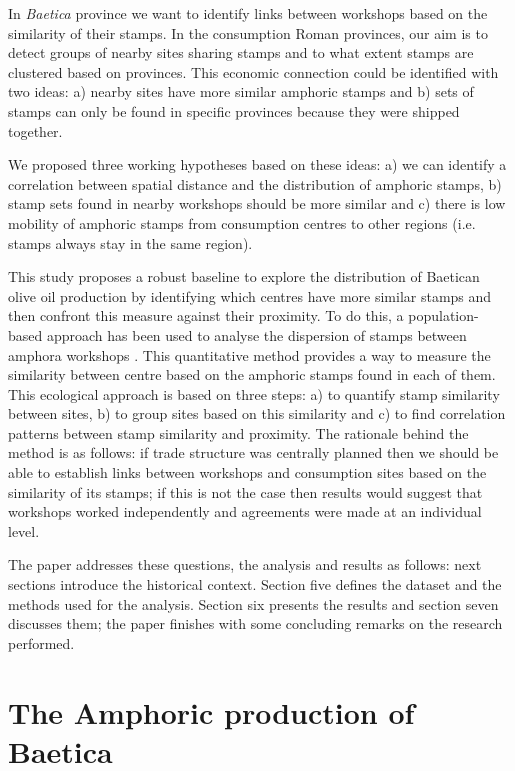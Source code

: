 In \textit{Baetica} province we want to identify links between workshops based on the similarity of their stamps. In the consumption Roman provinces, our aim is to detect groups of nearby sites sharing stamps and to what extent stamps are clustered based on provinces. This economic connection could be identified with two ideas: a) nearby sites have more similar amphoric stamps and b) sets of stamps can only be found in specific provinces because they were shipped together.

We proposed three working hypotheses based on these ideas: a) we can identify a correlation between spatial distance and the distribution of amphoric stamps, b) stamp sets found in nearby workshops should be more similar and c) there is low mobility of amphoric stamps from consumption centres to other regions (i.e. stamps always stay in the same region).

This study proposes a robust baseline to explore the distribution of Baetican olive oil production by identifying which centres have more similar stamps and then confront this measure against their proximity. To do this, a population-based approach has been used to analyse the dispersion of stamps between amphora workshops \citep{rubio-campillo_ecology_2018}. This quantitative method provides a way to measure the similarity between centre based on the amphoric stamps found in each of them. This ecological approach is based on three steps: a) to quantify stamp similarity between sites, b) to group sites based on this similarity and c) to find correlation patterns between stamp similarity and proximity. The rationale behind the method is as follows: if trade structure was centrally planned then we should be able to establish links between workshops and consumption sites based on the similarity of its stamps; if this is not the case then results would suggest that workshops worked independently and agreements were made at an individual level.

The paper addresses these questions, the analysis and results as follows: next sections introduce the historical context. Section five defines the dataset and the methods used for the analysis. Section six presents the results and section seven discusses them; the paper finishes with some concluding remarks on the research performed.


\section{The Amphoric production of Baetica}
\label{sec:1}

